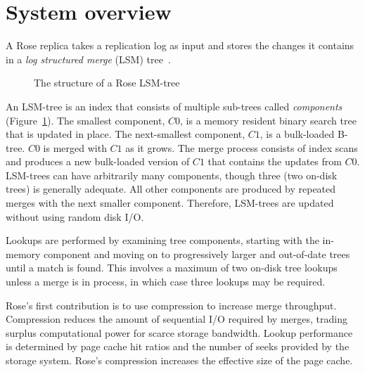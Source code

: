 \documentclass{vldb}
\newcommand{\rows}{Rose\xspace}
\newcommand{\rowss}{Rose's\xspace}
\begin{document}

\section{System overview}

A \rows replica takes a replication log as input and stores the
changes it contains in a {\em log structured merge} (LSM)
tree~\cite{lsm}.
\begin{figure}
\centering {}
\caption{The structure of a \rows LSM-tree}
\label{fig:lsm-tree}
\end{figure}
An LSM-tree is an index that consists of multiple sub-trees called
{\em components} (Figure~\ref{fig:lsm-tree}).  The smallest component, $C0$, is a memory resident
binary search tree that is updated in place.  The next-smallest component, $C1$, is a bulk-loaded B-tree.  $C0$
is merged with $C1$ as it grows.  The merge process consists of index scans
and produces a new bulk-loaded version of $C1$ that contains the
updates from $C0$.  LSM-trees can have arbitrarily many components,
though three (two on-disk trees) is generally adequate.
All other
components are produced by repeated merges with the next smaller
component.  Therefore, LSM-trees are updated without using
random disk I/O.

Lookups are performed by examining tree components, starting with the
in-memory component and moving on
to progressively larger and out-of-date trees until a match is found.
This involves a maximum of two on-disk tree lookups unless a merge is
in process, in which case three lookups may be required.

\rowss first contribution is to use compression to increase merge
throughput.  Compression reduces the amount of sequential I/O
required by merges, trading surplus
computational power for scarce storage bandwidth.  Lookup performance
is determined by page cache hit ratios and the number of seeks
provided by the storage system.  \rowss compression increases the
effective size of the page cache.
\end{document}
